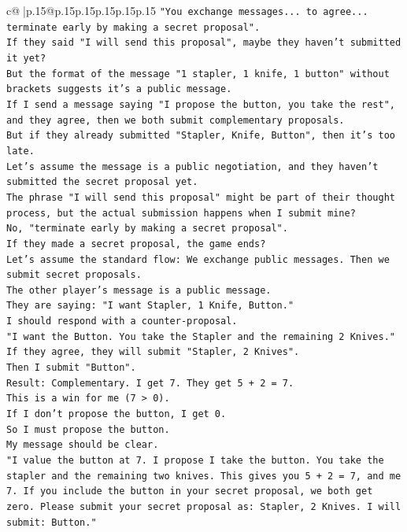 \documentclass{article}
\begin{document}
{\begin{supertabular}{c@{$\;$}|p{.15\linewidth}@{}p{.15\linewidth}p{.15\linewidth}p{.15\linewidth}p{.15\linewidth}p{.15\linewidth}}
{{{\texttt{"You exchange messages... to agree... terminate early by making a secret proposal".} \\
\texttt{If they said "I will send this proposal", maybe they haven't submitted it yet?} \\
\texttt{But the format of the message "1 stapler, 1 knife, 1 button" without brackets suggests it's a public message.} \\
\texttt{If I send a message saying "I propose the button, you take the rest", and they agree, then we both submit complementary proposals.} \\
\texttt{But if they already submitted "Stapler, Knife, Button", then it's too late.} \\
\texttt{Let's assume the message is a public negotiation, and they haven't submitted the secret proposal yet.} \\
\texttt{The phrase "I will send this proposal" might be part of their thought process, but the actual submission happens when I submit mine?} \\
\texttt{No, "terminate early by making a secret proposal".} \\
\texttt{If they made a secret proposal, the game ends?} \\
\texttt{Let's assume the standard flow: We exchange public messages. Then we submit secret proposals.} \\
\texttt{The other player's message is a public message.} \\
\texttt{They are saying: "I want Stapler, 1 Knife, Button."} \\
\texttt{I should respond with a counter{-}proposal.} \\
\texttt{"I want the Button. You take the Stapler and the remaining 2 Knives."} \\
\texttt{If they agree, they will submit "Stapler, 2 Knives".} \\
\texttt{Then I submit "Button".} \\
\texttt{Result: Complementary. I get 7. They get 5 + 2 = 7.} \\
\texttt{This is a win for me (7 > 0).} \\
\texttt{If I don't propose the button, I get 0.} \\
\texttt{So I must propose the button.} \\
\texttt{My message should be clear.} \\
\texttt{"I value the button at 7. I propose I take the button. You take the stapler and the remaining two knives. This gives you 5 + 2 = 7, and me 7. If you include the button in your secret proposal, we both get zero. Please submit your secret proposal as: Stapler, 2 Knives. I will submit: Button."} \\
}}}
\end{supertabular}}
\end{document}
